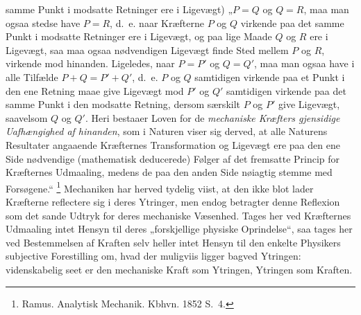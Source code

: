 \documentclass[12pt]{book}
\newcommand{\opage}[1]{\marginnote{\footnotesize\textit{[#1]}}}
\begin{document}
\opage{343} samme Punkt i modsatte Retninger ere i Ligevægt) „$P = Q$ og $Q = R$, maa man ogsaa
stedse have $P = R$, d.\ e. naar Kræfterne $P$ og $Q$ virkende paa det samme Punkt i
modsatte Retninger ere i Ligevægt, og paa lige Maade $Q$ og $R$ ere i Ligevægt, saa maa
ogsaa nødvendigen Ligevægt finde Sted mellem $P$ og $R$, virkende mod hinanden.
Ligeledes, naar $P = P'$ og $Q = Q'$, maa man ogsaa have i alle Tilfælde
$P + Q = P' + Q'$, d.\ e. $P$ og $Q$ samtidigen virkende paa et Punkt i den ene Retning
maae give Ligevægt mod $P'$ og $Q'$ samtidigen virkende paa det samme Punkt i den
modsatte Retning, dersom særskilt $P$ og $P'$ give Ligevægt, saavelsom $Q$ og $Q'$. Heri
bestaaer Loven for de \emph{mechaniske Kræfters gjensidige Uafhængighed af hinanden},
som i Naturen viser sig derved, at alle Naturens Resultater angaaende Kræfternes
Transformation og Ligevægt ere paa den ene Side nødvendige (mathematisk deducerede)
Følger af det fremsatte Princip for Kræfternes Udmaaling, medens de paa den anden Side
nøiagtig stemme med Forsøgene.“%
\footnote{Ramus. Analytisk Mechanik. Kbhvn. 1852 S.~4.}
Mechaniken har herved tydelig viist, at den ikke blot lader Kræfterne reflectere sig i
deres Ytringer, men endog betragter denne Reflexion som det sande Udtryk for deres
mechaniske Væsenhed. Tages her ved Kræfternes Udmaaling intet Hensyn til deres
„forskjellige physiske Oprindelse“, saa tages her ved Bestemmelsen af Kraften selv heller
intet Hensyn til den enkelte Physikers subjective Forestilling om, hvad der muligviis
ligger bagved Ytringen: videnskabelig seet er den mechaniske Kraft som Ytringen,
Ytringen som Kraften.
\end{document}
